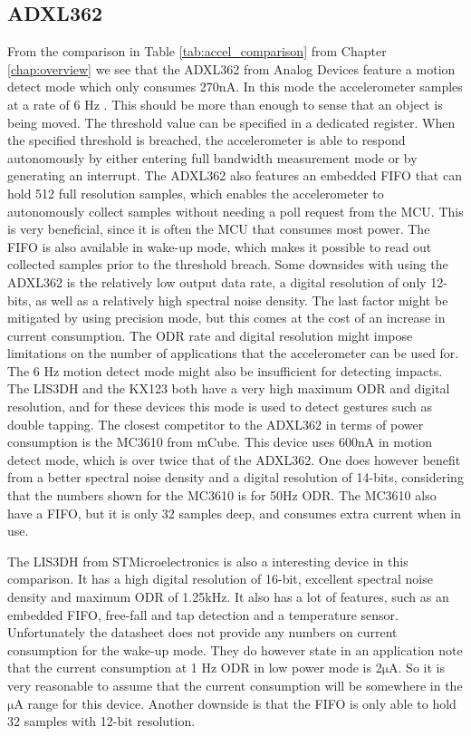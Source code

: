 \subsection{ADXL362}
From the comparison in Table \ref{tab:accel_comparison} from Chapter \ref{chap:overview} we see that the ADXL362 from Analog Devices feature a motion detect mode which only consumes 270nA. In this mode the accelerometer samples at a rate of 6 Hz \cite{adxl362}. This should be more than enough to sense that an object is being moved. The threshold value can be specified in a dedicated register. When the specified threshold is breached, the accelerometer is able to respond autonomously by either entering full bandwidth measurement mode or by generating an interrupt. The ADXL362 also features an embedded FIFO that can hold 512 full resolution samples, which enables the accelerometer to autonomously collect samples without needing a poll request from the MCU. This is very beneficial, since it is often the MCU that consumes most power. The FIFO is also available in wake-up mode, which makes it possible to read out collected samples prior to the threshold breach. Some downsides with using the ADXL362 is the relatively low output data rate, a digital resolution of only 12-bits, as well as a relatively high spectral noise density. The last factor might be mitigated by using precision mode, but this comes at the cost of an increase in current consumption. The ODR rate and digital resolution might impose limitations on the number of applications that the accelerometer can be used for. The 6 Hz motion detect mode might also be insufficient for detecting impacts. The LIS3DH and the KX123 both have a very high maximum ODR and digital resolution, and for these devices this mode is used to detect gestures such as double tapping. The closest competitor to the ADXL362 in terms of power consumption is the MC3610 from mCube. This device uses 600nA in motion detect mode, which is over twice that of the ADXL362. One does however benefit from a better spectral noise density and a digital resolution of 14-bits, considering that the numbers shown for the MC3610 is for 50Hz ODR. The MC3610 also have a FIFO, but it is only 32 samples deep, and consumes extra current when in use. 

The LIS3DH from STMicroelectronics is also a interesting device in this comparison. It has a high digital resolution of 16-bit, excellent spectral noise density and maximum ODR of 1.25kHz. It also has a lot of features, such as an embedded FIFO, free-fall and tap detection and a temperature sensor. Unfortunately the datasheet does not provide any numbers on current consumption for the wake-up mode. They do however state in an application note \cite{lis3dh_appnote} that the current consumption at 1 Hz ODR in low power mode is 2$\si{\micro\ampere}$. So it is very reasonable to assume that the current consumption will be somewhere in the $\si{\micro\ampere}$ range for this device. Another downside is that the FIFO is only able to hold 32 samples with 12-bit resolution.


